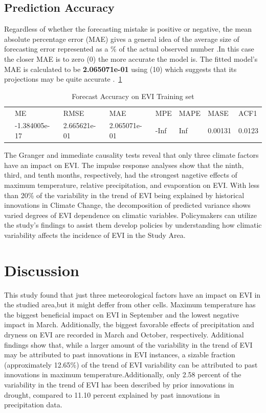 \subsection{Prediction Accuracy} Regardless of whether the forecasting mistake is positive or negative, the mean absolute percentage error (MAE) gives a general idea of the average size of forecasting error represented as a \% of the actual observed number .In this case the closer MAE is to zero (0) the more  accurate the model is. The fitted model's MAE is calculated to be \textbf{2.065071e-01} using (10) which suggests that its projections may be quite accurate .~\ref{label: Accuracy}
	\begin{center}
		\begin{table}
			\label{label: Accuracy}
			\caption{Forecast Accuracy on EVI Training set}
			\centering
			\small
			\addtolength{\tabcolsep}{-4pt}
			\begin{tabular}{llllllll}
				\hline\hline
				& ME	       & RMSE        &MAE          &MPE   &MAPE& MASE        &ACF1 \\
				&-1.384005e-17& 2.665621e-01& 2.065071e-01&-Inf  &Inf & 0.00131& 0.0123\\
				\hline
			\end{tabular}
		\end{table}
	\end{center}
The Granger and immediate causality tests reveal that only three climate factors have an impact on EVI. The impulse response analyses show that the ninth, third, and tenth months, respectively, had the strongest nagetive effects of maximum temperature, relative precipitation, and evaporation on EVI. With less than 20\% of the variability in the trend of EVI being explained by historical innovations in Climate Change, the decomposition of predicted variance shows varied degrees of EVI dependence on climatic variables. Policymakers can utilize the study's findings to assist them develop policies by understanding how climatic variability affects the incidence of EVI in the Study Area.

\section{ Discussion}
This study found that just three meteorological factors have an impact on EVI in the studied area,but  it might deffer from other cells. Maximum temperature has the biggest beneficial impact on EVI in September and the lowest negative impact in March. Additionally, the biggest favorable effects of precipitation and dryness on EVI are recorded in March and October, respectively. Additional findings show that, while a larger amount of the variability in the trend of EVI may be attributed to past innovations in EVI instances, a sizable fraction (approximately 12.65\%) of the trend of EVI variability can be attributed to past innovations in maximum temperature.Additionally, only 2.58 percent of the variability in the trend of EVI has been described by prior innovations in drought, compared to 11.10 percent explained by past innovations in precipitation data. 

